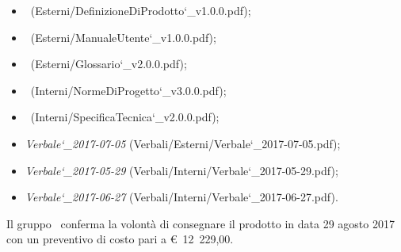 \documentclass[a4paper,12pt]{article}
\begin{document}
\begin{titlepage}
\begin{itemize}
			\item {}\ (Esterni/DefinizioneDiProdotto\char`_v1.0.0.pdf);
			\item \manualeutenteRQ\ (Esterni/ManualeUtente\char`_v1.0.0.pdf);
			\item \glossarioRQ\ (Esterni/Glossario\char`_v2.0.0.pdf);
			\item \normediprogettoRQ\ (Interni/NormeDiProgetto\char`_v3.0.0.pdf);	
			\item \specificatecnicaRQ\ (Interni/SpecificaTecnica\char`_v2.0.0.pdf);
			\item \textit{Verbale\char`_2017-07-05} (Verbali/Esterni/Verbale\char`_2017-07-05.pdf);
			\item \textit{Verbale\char`_2017-05-29} (Verbali/Interni/Verbale\char`_2017-05-29.pdf);
			\item \textit{Verbale\char`_2017-06-27} (Verbali/Interni/Verbale\char`_2017-06-27.pdf).
		\end{itemize}	
		Il gruppo \kaleidoscode\ conferma la volontà di consegnare il prodotto in data 29 agosto 2017
		con un preventivo di costo pari a \hbox{\euro\ 12 229,00}.\\
		

\end{titlepage}
\end{document}
